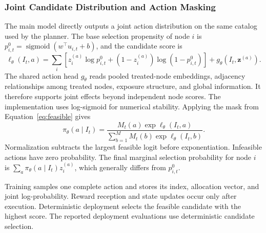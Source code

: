 \documentclass[a4paper,11pt]{article}
\numberwithin{equation}{section}
\begin{document}
\subsubsection{Joint Candidate Distribution and Action Masking}
The main model directly outputs a joint action distribution on the same catalog used by the planner. The base selection propensity of node $i$ is $p^0_{i,t}=\operatorname{sigmoid}(w^\top u_{i,t}+b)$, and the candidate score is
\begin{equation}
\ell_\theta(I_t,a)=\sum_i\left[z_i^{(a)}\log p^0_{i,t}
+(1-z_i^{(a)})\log(1-p^0_{i,t})\right]
+g_\theta(I_t,\mathbf z^{(a)}).
\label{eq:logit}
\end{equation}
The shared action head $g_\theta$ reads pooled treated-node embeddings, adjacency relationships among treated nodes, exposure structure, and global information. It therefore supports joint effects beyond independent node scores. The implementation uses log-sigmoid for numerical stability. Applying the mask from Equation~\eqref{eq:feasible} gives
\begin{equation}
\pi_\theta(a\mid I_t)=
\frac{M_t(a)\exp\ell_\theta(I_t,a)}
{\sum_{b=1}^M M_t(b)\exp\ell_\theta(I_t,b)}.
\label{eq:masked-policy}
\end{equation}
Normalization subtracts the largest feasible logit before exponentiation. Infeasible actions have zero probability. The final marginal selection probability for node $i$ is $\sum_a\pi_\theta(a\mid I_t)z_i^{(a)}$, which generally differs from $p^0_{i,t}$.

Training samples one complete action and stores its index, allocation vector, and joint log-probability. Reward reception and state updates occur only after execution. Deterministic deployment selects the feasible candidate with the highest score. The reported deployment evaluations use deterministic candidate selection.
\end{document}
